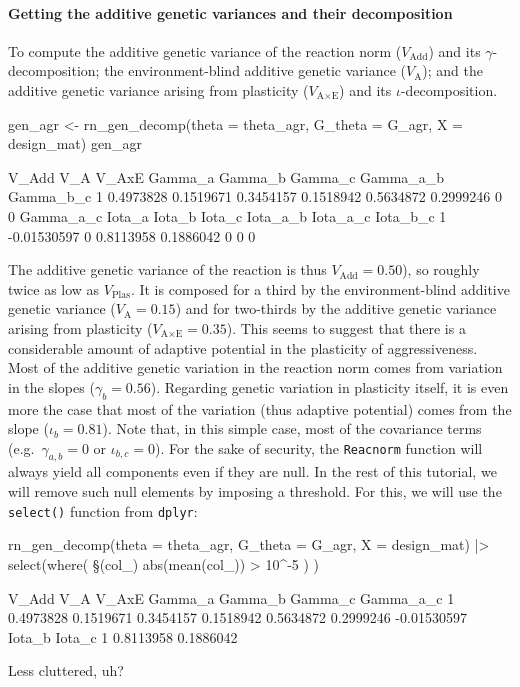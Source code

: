 \documentclass[a4paper,12pt,twoside]{article}
\begin{document}
\paragraph{Getting the additive genetic variances and their decomposition}
To compute the additive genetic variance of the reaction norm ($V_{\text{Add}}$) and its $\gamma$-decomposition; the environment-blind additive genetic variance  ($V_{\text{A}}$); and the additive genetic variance arising from plasticity ($V_{\text{A}\times\text{E}}$) and its $\iota$-decomposition.
\begin{Rinput}
gen_agr <-
    rn_gen_decomp(theta = theta_agr, G_theta = G_agr, X = design_mat)
gen_agr
\end{Rinput}
\begin{Routput}
      V_Add       V_A     V_AxE   Gamma_a   Gamma_b   Gamma_c Gamma_a_b Gamma_b_c
1 0.4973828 0.1519671 0.3454157 0.1518942 0.5634872 0.2999246         0         0
    Gamma_a_c Iota_a    Iota_b    Iota_c Iota_a_b Iota_a_c Iota_b_c
1 -0.01530597      0 0.8113958 0.1886042        0        0        0
\end{Routput}
The additive genetic variance of the reaction is thus $V_{\text{Add}} = 0.50$), so roughly twice as low as $V_{\text{Plas}}$.
It is composed for a third by the environment-blind additive genetic variance ($V_{\text{A}} = 0.15$) and for two-thirds by the additive genetic variance arising from plasticity ($V_{\text{A}\times\text{E}} = 0.35$).
This seems to suggest that there is a considerable amount of adaptive potential in the plasticity of aggressiveness.
Most of the additive genetic variation in the reaction norm comes from variation in the slopes ($\gamma_{b}=0.56$). Regarding genetic variation in plasticity itself, it is even more the case that most of the variation (thus adaptive potential) comes from the slope ($\iota_{b}=0.81$).
Note that, in this simple case, most of the covariance terms (e.g.\ $\gamma_{a,b}=0$ or $\iota_{b,c}=0$).
For the sake of security, the \texttt{Reacnorm} function will always yield all components even if they are null.
In the rest of this tutorial, we will remove such null elements by imposing a threshold. For this, we will use the \texttt{select()} function from \texttt{dplyr}:
\begin{Rinput}
rn_gen_decomp(theta = theta_agr, G_theta = G_agr, X = design_mat) |>
    select(where( \§§(col_) { abs(mean(col_)) > 10^-5 }) ) 
\end{Rinput}
\begin{Routput}
      V_Add       V_A     V_AxE   Gamma_a   Gamma_b   Gamma_c   Gamma_a_c
1 0.4973828 0.1519671 0.3454157 0.1518942 0.5634872 0.2999246 -0.01530597
     Iota_b    Iota_c
1 0.8113958 0.1886042
\end{Routput}
Less cluttered, uh?
\end{document}
